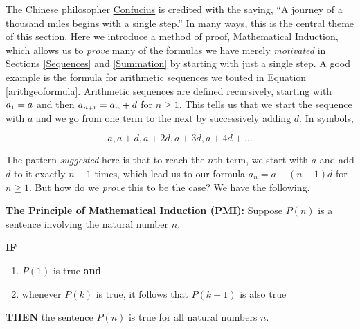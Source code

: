 

\setcounter{footnote}{0}

\label{Induction}

The Chinese philosopher \href{http://en.wikipedia.org/wiki/Confucius}{\underline{Confucius}} is credited with the saying, ``A journey of a thousand miles begins with a single step.''  In many ways, this is the central theme of this section.  Here we introduce a method of proof, Mathematical Induction, which allows us to \textit{prove} many of the formulas we have merely \textit{motivated} in Sections \ref{Sequences} and \ref{Summation} by starting with just a single step.  A good example is the formula for arithmetic sequences we touted in Equation \ref{arithgeoformula}.  Arithmetic sequences are defined recursively, starting with $a_{\mbox{\tiny$1$}} = a$ and then $a_{n\mbox{\tiny$ + 1$}} = a_{n} + d$ for $n \geq 1$.  This tells us that we start the sequence with  $a$ and we go from one term to the next by successively adding $d$.  In symbols,

\[ a, a+d, a+2d, a + 3d, a + 4d +  \ldots\]

The pattern \textit{suggested} here is  that to reach the $n$th term, we start with $a$ and add $d$ to it exactly $n-1$ times, which lead us to our formula $a_{n} = a + (n-1)d$ for $n \geq 1$.  But how do we \textit{prove} this to be the case?  We have the following.

\smallskip

\colorbox{ResultColor}{\bbm

\label{PMI} \textbf{The Principle of Mathematical Induction (PMI):}  Suppose $P(n)$ is a sentence involving the natural number $n$. 

\smallskip

\textbf{IF}

\begin{enumerate}

\item  $P(1)$ is true \textbf{and}

\item  whenever $P(k)$ is true, it follows that $P(k+1)$ is also true

\end{enumerate}

\textbf{THEN} the sentence $P(n)$ is true for all natural numbers $n$.

\ebm}


